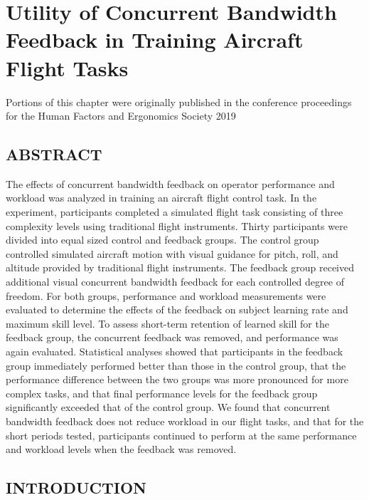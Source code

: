 \chapter{Utility of Concurrent Bandwidth Feedback in Training Aircraft Flight Tasks}


Portions of this chapter were originally published in the conference proceedings for the Human Factors and Ergonomics Society 2019%

\section{ABSTRACT}
The effects of concurrent bandwidth feedback on operator performance and workload was analyzed in training an aircraft flight control task.
In the experiment, participants completed a simulated flight task consisting of three complexity levels using traditional flight instruments.
Thirty participants were divided into equal sized control and feedback groups.
The control group controlled simulated aircraft motion with visual guidance for pitch, roll, and altitude provided by traditional flight instruments.
The feedback group received additional visual concurrent bandwidth feedback for each controlled degree of freedom.
For both groups, performance and workload measurements were evaluated to determine the effects of the feedback on subject learning rate and maximum skill level.
To assess short-term retention of learned skill for the feedback group, the concurrent feedback was removed, and performance was again evaluated.
Statistical analyses showed that participants in the feedback group immediately performed better than those in the control group, that the performance difference between the two groups was more pronounced for more complex tasks, and that final performance levels for the feedback group significantly exceeded that of the control group.
We found that concurrent bandwidth feedback does not reduce workload in our flight tasks, and that for the short periods tested, participants continued to perform at the same performance and workload levels when the feedback was removed.


\section{INTRODUCTION}

